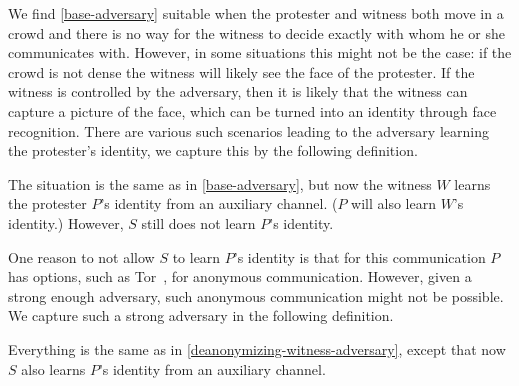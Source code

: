 We find \cref{base-adversary} suitable when the protester and witness both move 
in a crowd and there is no way for the witness to decide exactly with whom he 
or she communicates with.
However, in some situations this might not be the case: \Eg if the crowd is not 
dense the witness will likely see the face of the protester.
If the witness is controlled by the adversary, then it is likely that the 
witness can capture a picture of the face, which can be turned into an identity 
through face recognition.
There are various such scenarios leading to the adversary learning the 
protester's identity, we capture this by the following definition.

\begin{definition}%
  \label{deanonymizing-witness-adversary}
  The situation is the same as in \cref{base-adversary}, but now the witness 
  \(W\) learns the protester \(P\)'s identity from an auxiliary channel.
  (\(P\) will also learn \(W\)'s identity.)
  However, \(S\) still does not learn \(P\)'s identity.
\end{definition}


One reason to not allow \(S\) to learn \(P\)'s identity is that for this communication \(P\) has options, such as Tor~\cite{Tor}, for anonymous communication.
However, given a strong enough adversary, such anonymous communication might not be possible.
We capture such a strong adversary in the following definition.

\begin{definition}%
  \label{deanonymizing-adversary}
  Everything is the same as in \cref{deanonymizing-witness-adversary}, except 
  that now \(S\) also learns \(P\)'s identity from an auxiliary channel.
\end{definition}

